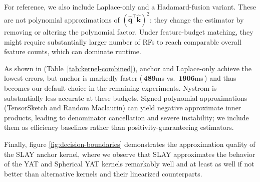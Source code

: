 \documentclass{article}
\begin{document}
For reference, we also include Laplace-only and a Hadamard-fusion variant. These are not polynomial approximations of $(\widehat{\mathbf{q}}^\top \widehat{\mathbf{k}})^2$: they change the estimator by removing or altering the polynomial factor. Under feature-budget matching, they might require substantially larger number of RFs to reach comparable overall feature counts, which can dominate runtime.
\begin{table}[htbp]
\centering
\small
\caption{\small{Kernel approximation quality and latency comparison. Rel.~$\ell_2$ is relative L2 error, Cos is cosine similarity, MSE is mean squared error, and Latency is forward-pass time in milliseconds. For large-scale snapshot, see the ``Large'' block in Table~\ref{tab:poly-sweep}).}}
\label{tab:kernel-combined}
\end{table}

As shown in (Table~\ref{tab:kernel-combined}), anchor and Laplace-only achieve the lowest errors, but anchor is markedly faster (\,$\mathbf{489}$ms vs.~$\mathbf{1906}$ms\,) and thus becomes our default choice in the remaining experiments. Nystrom is substantially less accurate at these budgets. Signed polynomial approximations (TensorSketch and Random Maclaurin) can yield negative approximate inner products, leading to denominator cancellation and severe instability; we include them as efficiency baselines rather than positivity-guaranteeing estimators.

Finally, figure \ref{fig:decision-boundaries} demonstrates the approximation quality of the SLAY anchor kernel, where we observe that SLAY approximates the behavior of the YAT and Spherical YAT kernels remarkably well and at least as well if not better than alternative kernels and their linearized counterparts.
\end{document}

